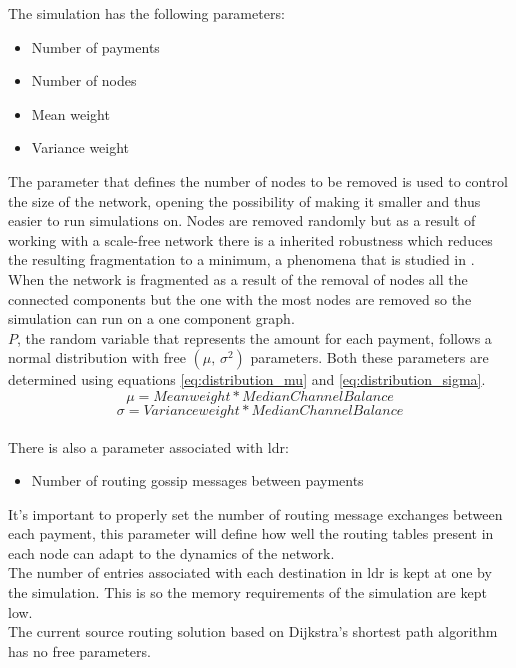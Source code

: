 The simulation has the following parameters:
\begin{itemize}
    \item Number of payments
    \item Number of nodes
    \item Mean weight
    \item Variance weight
\end{itemize}
The parameter that defines the number of nodes to be removed is used to control the size of the network, opening the possibility of making it smaller and thus easier to run simulations on. Nodes are removed randomly but as a result of working with a scale-free network there is a inherited robustness \cite{network_science} which reduces the resulting fragmentation to a minimum, a phenomena that is studied in \cite{ln_topological}. When the network is fragmented as a result of the removal of nodes all the connected components but the one with the most nodes are removed so the simulation can run on a one component graph.\\
$P$, the random variable that represents the amount for each payment, follows a normal distribution with free $(\mu,\,\sigma^{2})$ parameters. Both these parameters are determined using equations \ref{eq:distribution_mu} and \ref{eq:distribution_sigma}. 
\begin{equation}
    \mu = Mean weight * Median Channel Balance
    \label{eq:distribution_mu}
\end{equation}
\begin{equation}
    \sigma = Variance weight * Median Channel Balance
    \label{eq:distribution_sigma}
\end{equation}
\\
There is also a parameter associated with \acrshort{ldr}:
\begin{itemize}
    \item Number of routing gossip messages between payments
\end{itemize}
It's important to properly set the number of routing message exchanges between each payment, this parameter will define how well the routing tables present in each node can adapt to the dynamics of the network.\\
The number of entries associated with each destination in \acrshort{ldr} is kept at one by the simulation. This is so the memory requirements of the simulation are kept low.\\
The current source routing solution based on Dijkstra's shortest path algorithm has no free parameters.\\
